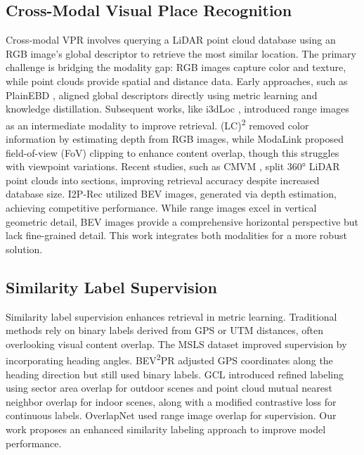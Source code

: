 \subsection{Cross-Modal Visual Place Recognition}
Cross-modal VPR involves querying a LiDAR point cloud database using an RGB image's global descriptor to retrieve the most similar location. The primary challenge is bridging the modality gap: RGB images capture color and texture, while point clouds provide spatial and distance data. Early approaches, such as PlainEBD \cite{cattaneo2020global}, aligned global descriptors directly using metric learning and knowledge distillation. Subsequent works, like i3dLoc \cite{yin2021i3dloc}, introduced range images as an intermediate modality to improve retrieval. (LC)\textsuperscript{2} \cite{lee20232} removed color information by estimating depth from RGB images, while ModaLink \cite{xie2024modalink} proposed field-of-view (FoV) clipping to enhance content overlap, though this struggles with viewpoint variations. Recent studies, such as CMVM \cite{yao2024monocular}, split 360° LiDAR point clouds into sections, improving retrieval accuracy despite increased database size. I2P-Rec \cite{zheng2023i2p} utilized BEV images, generated via depth estimation, achieving competitive performance. While range images excel in vertical geometric detail, BEV images provide a comprehensive horizontal perspective but lack fine-grained detail. This work integrates both modalities for a more robust solution.

\subsection{Similarity Label Supervision}
Similarity label supervision enhances retrieval in metric learning. Traditional methods rely on binary labels derived from GPS or UTM distances, often overlooking visual content overlap. The MSLS \cite{warburg2020mapillary} dataset improved supervision by incorporating heading angles. BEV\textsuperscript{2}PR \cite{ge2024bev2pr} adjusted GPS coordinates along the heading direction but still used binary labels. GCL \cite{leyva2023data} introduced refined labeling using sector area overlap for outdoor scenes and point cloud mutual nearest neighbor overlap for indoor scenes, along with a modified contrastive loss for continuous labels. OverlapNet \cite{chen2021overlapnet} used range image overlap for supervision. Our work proposes an enhanced similarity labeling approach to improve model performance.